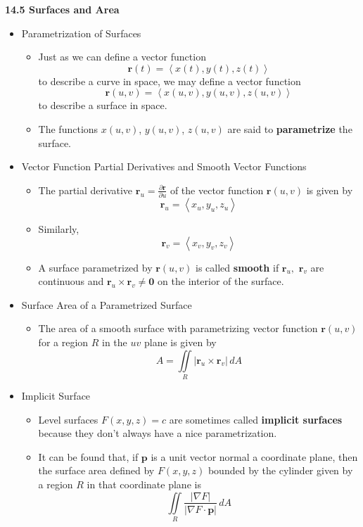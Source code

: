 \documentclass[12pt]{article}
\theoremstyle{plain}
\theoremstyle{definition}
\theoremstyle{remark}
\newcommand{\vect}[1]{\mathbf{#1}}
\begin{document}
	\newpage
	
	\centerline{\bf 14.5 Surfaces and Area}
	
	\begin{itemize}
		
	\item Parametrization of Surfaces
	
		\begin{itemize}
		\item Just as we can define a vector function \[\vect{r}(t)=\left<x(t),y(t),z(t)\right>\] to describe a curve in space, we may define a vector function \[\vect{r}(u,v)=\left<x(u,v),y(u,v),z(u,v)\right>\] to describe a surface in space.
		\item The functions $x(u,v)$, $y(u,v)$, $z(u,v)$ are said to \textbf{parametrize} the surface.
		\end{itemize}
		
	\item Vector Function Partial Derivatives and Smooth Vector Functions
	
		\begin{itemize}
		\item The partial derivative $\vect{r}_u=\frac{\partial \vect{r}}{\partial u}$ of the vector function $\vect{r}(u,v)$ is given by \[\vect{r}_u=\left<x_u,y_u,z_u\right>\]
		\item Similarly, \[\vect{r}_v=\left<x_v,y_v,z_v\right>\]
		\item A surface parametrized by $\vect{r}(u,v)$ is called \textbf{smooth} if $\vect{r}_u,$ $\vect{r}_v$ are continuous and $\vect{r}_u\times\vect{r}_v\not= \vect{0}$ on the interior of the surface. 
		\end{itemize}
		
	\item Surface Area of a Parametrized Surface
	
		\begin{itemize}
		\item The area of a smooth surface with parametrizing vector function $\vect{r}(u,v)$ for a region $R$ in the $uv$ plane is given by \[A = \iint\limits_R |\vect{r}_u\times\vect{r}_v|\,dA\]
		\end{itemize}
		
	\item Implicit Surface
	
		\begin{itemize}
		\item Level surfaces $F(x,y,z)=c$ are sometimes called \textbf{implicit surfaces} because they don't always have a nice parametrization.
		\item It can be found that, if $\vect{p}$ is a unit vector normal a coordinate plane, then the surface area defined by $F(x,y,z)$ bounded by the cylinder given by a region $R$ in that coordinate plane is \[\iint\limits_R \frac{|\nabla F|}{|\nabla F \cdot \vect{p}|}\,dA\]
		\end{itemize}
		

\end{itemize}
\end{document}
